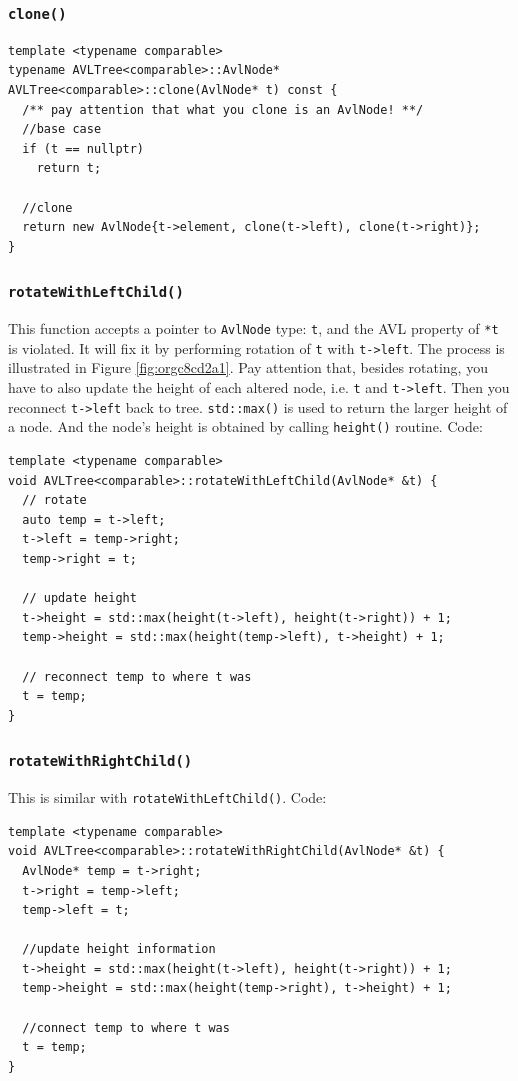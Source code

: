 \documentclass[12pt]{book}
\begin{document}
\subsubsection{\texttt{clone()}}
\label{sec:org22f960e}
\begin{verbatim}
template <typename comparable>
typename AVLTree<comparable>::AvlNode* AVLTree<comparable>::clone(AvlNode* t) const {
  /** pay attention that what you clone is an AvlNode! **/
  //base case 
  if (t == nullptr)
    return t;

  //clone 
  return new AvlNode{t->element, clone(t->left), clone(t->right)};
}
\end{verbatim}
\subsubsection{\texttt{rotateWithLeftChild()}}
\label{sec:org9b88680}
This function accepts a pointer to \texttt{AvlNode} type: \texttt{t}, and the AVL property of \texttt{*t} is violated. It will fix it by performing rotation of \texttt{t} with \texttt{t->left}. The process is illustrated in Figure \ref{fig:orgc8cd2a1}. Pay attention that, besides rotating, you have to also update the height of each altered node, i.e. \texttt{t} and \texttt{t->left}. Then you reconnect \texttt{t->left} back to tree. \texttt{std::max()} is used to return the larger height of a node. And the node's height is obtained by calling \texttt{height()} routine.
Code:
\begin{verbatim}
template <typename comparable>
void AVLTree<comparable>::rotateWithLeftChild(AvlNode* &t) {
  // rotate
  auto temp = t->left;
  t->left = temp->right;
  temp->right = t;

  // update height
  t->height = std::max(height(t->left), height(t->right)) + 1;
  temp->height = std::max(height(temp->left), t->height) + 1;

  // reconnect temp to where t was
  t = temp;
}
\end{verbatim}
\subsubsection{\texttt{rotateWithRightChild()}}
\label{sec:orgc1de62b}
This is similar with \texttt{rotateWithLeftChild()}. Code:
\begin{verbatim}
template <typename comparable>
void AVLTree<comparable>::rotateWithRightChild(AvlNode* &t) {
  AvlNode* temp = t->right;
  t->right = temp->left;
  temp->left = t;

  //update height information
  t->height = std::max(height(t->left), height(t->right)) + 1;
  temp->height = std::max(height(temp->right), t->height) + 1;

  //connect temp to where t was
  t = temp;
}
\end{verbatim}
\end{document}
